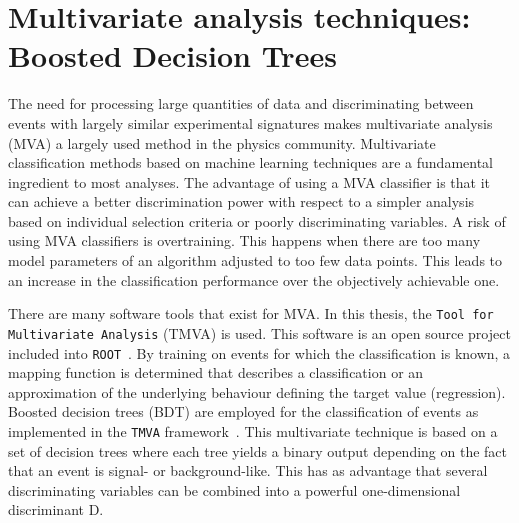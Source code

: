 \section{Multivariate analysis techniques: Boosted Decision Trees}
\label{sec:BDT}
The need for processing large quantities of data and discriminating between events with largely similar experimental signatures makes multivariate  analysis (MVA) a largely used method in the physics community. Multivariate classification methods based on machine learning techniques are a fundamental ingredient to most analyses. The advantage of using a MVA classifier is that it can achieve a better discrimination power with respect to a simpler analysis based on individual selection criteria or poorly discriminating variables. A risk of using MVA classifiers is overtraining.  This happens when there are too many model parameters of an algorithm adjusted to too few data points. This leads to an increase in the classification performance over the objectively achievable one.

There are many software tools that exist for MVA. In this thesis,  the \texttt{Tool for Multivariate Analysis} (TMVA) \cite{2007physics3039H} is used. This software is an open source project included into \texttt{ROOT}~\cite{Brun:1997pa}. 
 By training on events for which the classification is known, a mapping function is determined that describes a classification or an approximation of the underlying behaviour defining the target value (regression). Boosted decision trees (BDT) are employed for the classification of events as implemented in the \texttt{TMVA} framework~\cite{2007physics3039H}. This multivariate technique is based on a set of decision trees where each tree yields a binary output depending on the fact that an event is signal- or background-like. This has as advantage  that several discriminating variables can be combined into a powerful one-dimensional discriminant D. 

